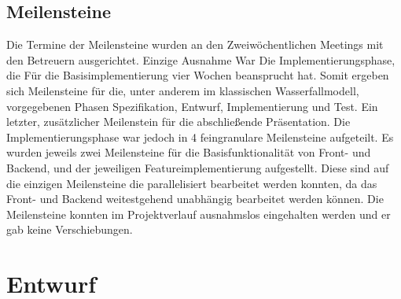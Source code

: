 \subsection{Meilensteine}
Die Termine der Meilensteine wurden an den Zweiwöchentlichen Meetings mit den Betreuern ausgerichtet. Einzige Ausnahme War Die Implementierungsphase, die Für die Basisimplementierung vier Wochen beansprucht hat. Somit ergeben sich Meilensteine für die, unter anderem im klassischen Wasserfallmodell, vorgegebenen Phasen Spezifikation, Entwurf, Implementierung und Test. Ein letzter, zusätzlicher Meilenstein für die abschließende Präsentation. Die Implementierungsphase war jedoch in  4 feingranulare Meilensteine aufgeteilt. Es wurden jeweils zwei Meilensteine für die Basisfunktionalität von Front- und Backend, und der jeweiligen Featureimplementierung aufgestellt. Diese sind auf die einzigen Meilensteine die parallelisiert bearbeitet werden konnten, da das Front- und Backend weitestgehend unabhängig bearbeitet werden können.
\newline
[Bild]
\newline
Die Meilensteine konnten im Projektverlauf ausnahmslos eingehalten werden und er gab keine Verschiebungen.

\section{Entwurf}

